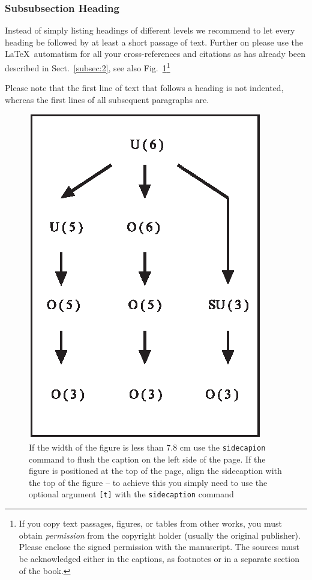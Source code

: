 \documentclass[graybox]{svmult}
\begin{document}
\subsubsection{Subsubsection Heading}
Instead of simply listing headings of different levels we recommend to let every heading be followed by at least a short passage of text.  Further on please use the \LaTeX\ automatism for all your cross-references and citations as has already been described in Sect.~\ref{subsec:2}, see also Fig.~\ref{fig:1}\footnote{If you copy text passages, figures, or tables from other works, you must obtain \textit{permission} from the copyright holder (usually the original publisher). Please enclose the signed permission with the manuscript. The sources must be acknowledged either in the captions, as footnotes or in a separate section of the book.}

Please note that the first line of text that follows a heading is not indented, whereas the first lines of all subsequent paragraphs are.

%
\begin{figure}[b]
\sidecaption
\includegraphics[scale=.65]{figure}
%
%
\caption{If the width of the figure is less than 7.8 cm use the \texttt{sidecapion} command to flush the caption on the left side of the page. If the figure is positioned at the top of the page, align the sidecaption with the top of the figure -- to achieve this you simply need to use the optional argument \texttt{[t]} with the \texttt{sidecaption} command}
\label{fig:1}       %
\end{figure}
\end{document}

